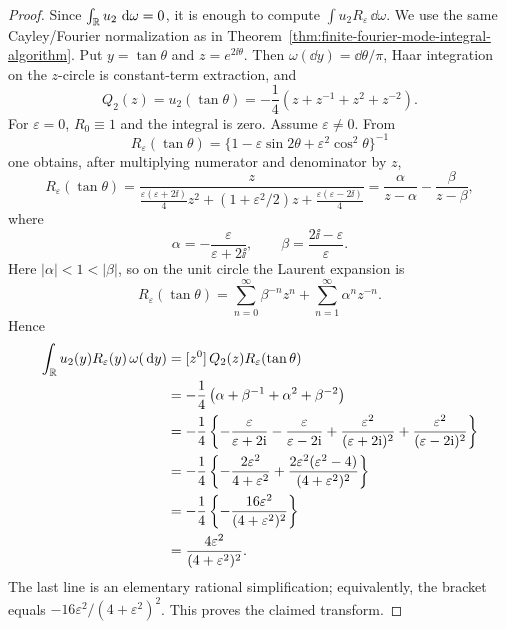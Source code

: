 \ifdefined\JFAArticleMain
{}
\else
\begin{proof}
Since \(\int_{\mathbb{R}}u_2\,\,\mathrm{d}\omega=0\), it is enough to compute
\(\int u_2R_\varepsilon\,\dd\omega\).  We use the same Cayley/Fourier
normalization as in Theorem~\ref{thm:finite-fourier-mode-integral-algorithm}.
Put \(y=\tan\theta\) and \(z=e^{2\ii\theta}\).  Then
\(\omega(\dd y)=\dd\theta/\pi\), Haar integration on the \(z\)-circle is
constant-term extraction, and
\[
  Q_2(z)=u_2(\tan\theta)
  =-\frac14(z+z^{-1}+z^2+z^{-2}).
\]
For \(\varepsilon=0\), \(R_0\equiv1\) and the integral is zero.  Assume
\(\varepsilon\ne0\).  From
\[
R_\varepsilon(\tan\theta)
=\{1-\varepsilon\sin2\theta+\varepsilon^2\cos^2\theta\}^{-1}
\]
one obtains, after multiplying numerator and denominator by \(z\),
\[
R_\varepsilon(\tan\theta)
=
\frac{z}
{\frac{\varepsilon(\varepsilon+2\ii)}4z^2
+(1+\varepsilon^2/2)z
+\frac{\varepsilon(\varepsilon-2\ii)}4}
=
\frac{\alpha}{z-\alpha}-\frac{\beta}{z-\beta},
\]
where
\[
\alpha=-\frac{\varepsilon}{\varepsilon+2\ii},
\qquad
\beta=\frac{2\ii-\varepsilon}{\varepsilon}.
\]
Here \(|\alpha|<1<|\beta|\), so on the unit circle the Laurent expansion is
\[
R_\varepsilon(\tan\theta)
=\sum_{n=0}^{\infty}\beta^{-n}z^n
+\sum_{n=1}^{\infty}\alpha^nz^{-n}.
\]
Hence
\[
\begin{aligned}
\int_{\mathbb{R}}u_2(y)R_\varepsilon(y)\,\omega(\,\mathrm{d} y)
&=[z^0]\,Q_2(z)R_\varepsilon(\tan\theta)\\
&=-\frac14\left(\alpha+\beta^{-1}+\alpha^2+\beta^{-2}\right)\\
&=-\frac14\left\{
-\frac{\varepsilon}{\varepsilon+2\mathrm{i}}
-\frac{\varepsilon}{\varepsilon-2\mathrm{i}}
+\frac{\varepsilon^2}{(\varepsilon+2\mathrm{i})^2}
+\frac{\varepsilon^2}{(\varepsilon-2\mathrm{i})^2}
\right\}  \\
&=-\frac14\left\{
-\frac{2\varepsilon^2}{4+\varepsilon^2}
+\frac{2\varepsilon^2(\varepsilon^2-4)}
{(4+\varepsilon^2)^2}
\right\}  \\
&=-\frac14\left\{
-\frac{16\varepsilon^2}{(4+\varepsilon^2)^2}
\right\}  \\
&=\frac{4\varepsilon^2}{(4+\varepsilon^2)^2}.
\end{aligned}
\]
The last line is an elementary rational simplification; equivalently, the
bracket equals \(-16\varepsilon^2/(4+\varepsilon^2)^2\).  This proves the
claimed transform.
\end{proof}
\fi

